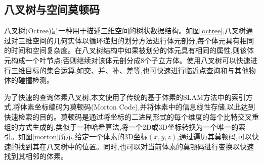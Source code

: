 \subsection{八叉树与空间莫顿码}
\begin{figure}[htbp]
    \centering
    \centering
\end{figure}
八叉树(Octree)是一种用于描述三维空间的树状数据结构。如图\ref{octree},八叉树通过对三维空间的几何实体以循环递归的划分方法进行体元剖分,每个体元具有相同的时间和空间复杂度。在八叉树结构中如果被划分的体元具有相同的属性,则该体元构成一个叶节点;否则继续对该体元剖分成8个子立方体。使用八叉树可以快速进行三维目标的集合运算,如交、并、补、差等,也可快速进行临近点查询和与其他物体的碰撞检测。

为了快速的查询体素八叉树,本文使用了传统的基于体素的SLAM方法\cite{traditionalslam}中的索引方式,将体素坐标编码为莫顿码(Morton Code),并将体素中的信息线性存储,以此达到快速检索的目的。莫顿码是通过将坐标的二进制形式的每个维度的每个比特交叉重组的方式生成的,类似于一种哈希算法,将一个2D或3D坐标转换为一个唯一的索引。如图\ref{morton}所示,给定一个体素的3D坐标$(x,y,z)$,通过遍历其莫顿码,可以快速的找到其在八叉树中的位置。同时,也可以对当前体素的莫顿码进行变换以快速找到其相邻的体素。
